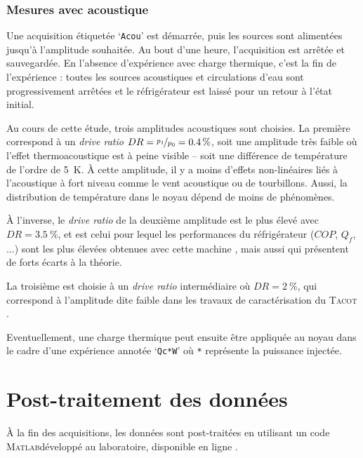 \subsubsection{Mesures avec acoustique}\label{chap:MesureAvecAcou} 
Une acquisition étiquetée `\texttt{Acou}' est démarrée, puis les sources sont alimentées jusqu'à l'amplitude souhaitée. Au bout d'une heure, l'acquisition est arrêtée et sauvegardée. En l'absence d'expérience avec charge thermique, c'est la fin de l'expérience : toutes les sources acoustiques et circulations d'eau sont progressivement arrêtées et le réfrigérateur est laissé pour un retour à l'état initial.\smallskip

Au cours de cette étude, trois amplitudes acoustiques sont choisies. La première correspond à un \textit{drive ratio} $DR=\nicefrac{p_1}{p_0}=\qty{.4}{\percent}$, soit une amplitude très faible où l'effet thermoacoustique est à peine visible -- soit une différence de température de l'ordre de \qty{5}{\kelvin}. À cette amplitude, il y a moins d'effets non-linéaires liés à l'acoustique à fort niveau comme le vent acoustique ou de tourbillons. Aussi, la distribution de température dans le noyau dépend de moins de phénomènes.

À l'inverse, le \textit{drive ratio} de la deuxième amplitude est le plus élevé avec $DR=\qty{3.5}{\percent}$, et est celui pour lequel les performances du réfrigérateur ($COP$, $Q_f$, ...) sont les plus élevées obtenues avec cette machine \cite{ramadan_design_2021}, mais aussi qui présentent de forts écarts à la théorie. 

La troisième est choisie à un \textit{drive ratio} intermédiaire où $DR=\qty{2}{\percent}$, qui correspond à l'amplitude dite \og faible \fg{} dans les travaux de caractérisation du \textsc{Tacot} \cite{ramadan_design_2021}.  \smallskip

Eventuellement, une charge thermique peut ensuite être appliquée au noyau dans le cadre d'une expérience annotée `\texttt{Qc*W}' où \texttt{*} représente la puissance injectée. 

\section{Post-traitement des données}
À la fin des acquisitions, les données sont post-traitées en utilisant un code \textsc{Matlab}\textss\textregistered développé au laboratoire, disponible en ligne \cite{fontbonne_postprocessing_2025}.

